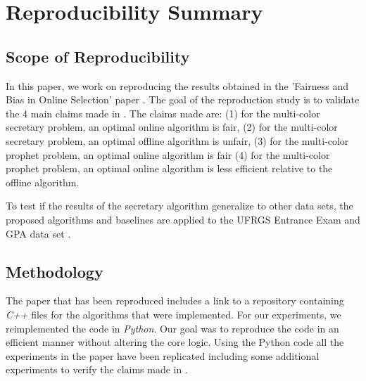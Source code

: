 

%

\section{Reproducibility Summary}

    \subsection*{Scope of Reproducibility}
    In this paper, we work on reproducing the results obtained in the 'Fairness and Bias in Online Selection' paper \citep{correa2021fairness}. The goal of the reproduction study is to validate the 4 main claims made in \citep{correa2021fairness}. The claims made are:
    (1) for the multi-color secretary problem, an optimal online algorithm is fair, (2) for the multi-color secretary problem, an optimal offline algorithm is unfair, (3) for the multi-color prophet problem, an optimal online algorithm is fair (4) for the multi-color prophet problem, an optimal online algorithm is less efficient relative to the offline algorithm.

    To test if the results of the secretary algorithm generalize to other data sets, the proposed algorithms and baselines are applied to the UFRGS Entrance Exam and GPA data set \citep{DVN/O35FW8_2019}.

    \subsection*{Methodology}
    The paper that has been reproduced includes a link to a repository containing \textit{C++} files for the algorithms that were implemented. For our experiments, we reimplemented the code in \textit{Python}. Our goal was to reproduce the code in an efficient manner without altering the core logic. Using the Python code all the experiments in the paper have been replicated including some additional experiments to verify the claims made in \citep{correa2021fairness}.

